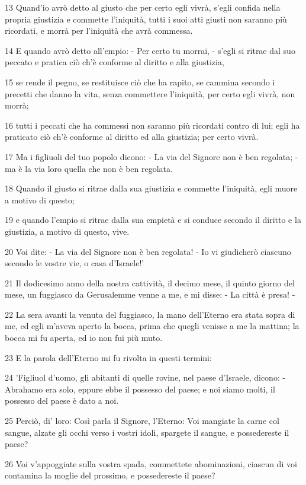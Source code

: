\par 13 Quand'io avrò detto al giusto che per certo egli vivrà, s'egli confida nella propria giustizia e commette l'iniquità, tutti i suoi atti giusti non saranno più ricordati, e morrà per l'iniquità che avrà commessa.
\par 14 E quando avrò detto all'empio: - Per certo tu morrai, - s'egli si ritrae dal suo peccato e pratica ciò ch'è conforme al diritto e alla giustizia,
\par 15 se rende il pegno, se restituisce ciò che ha rapito, se cammina secondo i precetti che danno la vita, senza commettere l'iniquità, per certo egli vivrà, non morrà;
\par 16 tutti i peccati che ha commessi non saranno più ricordati contro di lui; egli ha praticato ciò ch'è conforme al diritto ed alla giustizia; per certo vivrà.
\par 17 Ma i figliuoli del tuo popolo dicono: - La via del Signore non è ben regolata; - ma è la via loro quella che non è ben regolata.
\par 18 Quando il giusto si ritrae dalla sua giustizia e commette l'iniquità, egli muore a motivo di questo;
\par 19 e quando l'empio si ritrae dalla sua empietà e si conduce secondo il diritto e la giustizia, a motivo di questo, vive.
\par 20 Voi dite: - La via del Signore non è ben regolata! - Io vi giudicherò ciascuno secondo le vostre vie, o casa d'Israele!'
\par 21 Il dodicesimo anno della nostra cattività, il decimo mese, il quinto giorno del mese, un fuggiasco da Gerusalemme venne a me, e mi disse: - La città è presa! -
\par 22 La sera avanti la venuta del fuggiasco, la mano dell'Eterno era stata sopra di me, ed egli m'aveva aperto la bocca, prima che quegli venisse a me la mattina; la bocca mi fu aperta, ed io non fui più muto.
\par 23 E la parola dell'Eterno mi fu rivolta in questi termini:
\par 24 'Figliuol d'uomo, gli abitanti di quelle rovine, nel paese d'Israele, dicono: - Abrahamo era solo, eppure ebbe il possesso del paese; e noi siamo molti, il possesso del paese è dato a noi.
\par 25 Perciò, di' loro: Così parla il Signore, l'Eterno: Voi mangiate la carne col sangue, alzate gli occhi verso i vostri idoli, spargete il sangue, e possedereste il paese?
\par 26 Voi v'appoggiate sulla vostra spada, commettete abominazioni, ciascun di voi contamina la moglie del prossimo, e possedereste il paese?
